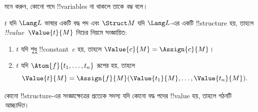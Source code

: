 \documentclass[../../../include/open-logic-section]{subfiles}
\begin{document}


\begin{explain}
মনে করুন, কোনো পদে !!{variable}s না থাকলে তাকে \emph{বদ্ধ} বলে।
\end{explain}

\begin{defn}[বদ্ধ পদের !!^{value}]
$t$ যদি $\Lang L$ ভাষার একটি বদ্ধ পদ এবং $\Struct M$ যদি $\Lang L$-এর
একটি !!{structure} হয়, তাহলে \emph{!!{value}}~$\Value{t}{M}$ নিচের
নিয়মে সংজ্ঞায়িত:
\begin{enumerate}
\item $t$ যদি শুধু !!{constant}~$c$ হয়, তাহলে $\Value{c}{M} = \Assign{c}{M}$।
\item $t$ যদি $\Atom{f}{t_1, \ldots, t_n}$ রূপের হয়, তাহলে
  \[
  \Value{t}{M} = \Assign{f}{M}(\Value{t_1}{M}, \ldots,
  \Value{t_n}{M}).
  \]
\end{enumerate}
\end{defn}

\begin{defn}[আচ্ছাদিত !!{structure}]
কোনো !!{structure}-এর সংজ্ঞাক্ষেত্রের প্রত্যেক সদস্য যদি কোনো বদ্ধ
পদের !!{value} হয়, তাহলে গঠনটি \emph{আচ্ছাদিত}।
\end{defn}
\end{document}
